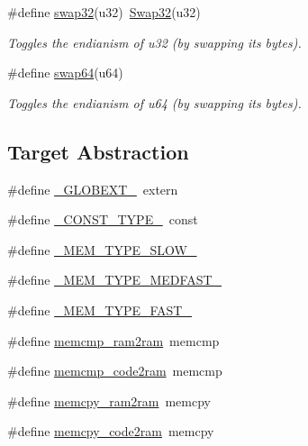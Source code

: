 \begin{DoxyCompactItemize}
\#define \mbox{\hyperlink{group__group__sam0__utils_ga46025d8a12ccc9f4268c84e56c457416}{swap32}}(u32)~\mbox{\hyperlink{group__group__sam0__utils_ga5e9bc2e3b3e43eadc3210b02cab6ac64}{Swap32}}(u32)
\begin{DoxyCompactList}\small\item\em Toggles the endianism of {\itshape u32} (by swapping its bytes). \end{DoxyCompactList}\item 
\#define \mbox{\hyperlink{group__group__sam0__utils_ga78484801bd5bea7d382b34a4ed1f345d}{swap64}}(u64)
\begin{DoxyCompactList}\small\item\em Toggles the endianism of {\itshape u64} (by swapping its bytes). \end{DoxyCompactList}\end{DoxyCompactItemize}
\subsection*{Target Abstraction}
\begin{DoxyCompactItemize}
\item 
\#define \mbox{\hyperlink{group__group__sam0__utils_gad4d03be3b8f3d15ed804170a1311ec98}{\+\_\+\+G\+L\+O\+B\+E\+X\+T\+\_\+}}~extern
\item 
\#define \mbox{\hyperlink{group__group__sam0__utils_ga8e0d79d43ad9295d5193ca29f109a762}{\+\_\+\+C\+O\+N\+S\+T\+\_\+\+T\+Y\+P\+E\+\_\+}}~const
\item 
\#define \mbox{\hyperlink{group__group__sam0__utils_ga35d552e8456cfb2b810baa0a9212c98e}{\+\_\+\+M\+E\+M\+\_\+\+T\+Y\+P\+E\+\_\+\+S\+L\+O\+W\+\_\+}}
\item 
\#define \mbox{\hyperlink{group__group__sam0__utils_gadcd997c76f95854090b17513c4ef3891}{\+\_\+\+M\+E\+M\+\_\+\+T\+Y\+P\+E\+\_\+\+M\+E\+D\+F\+A\+S\+T\+\_\+}}
\item 
\#define \mbox{\hyperlink{group__group__sam0__utils_gabf669e579471cadcf68d9ffc440e68b1}{\+\_\+\+M\+E\+M\+\_\+\+T\+Y\+P\+E\+\_\+\+F\+A\+S\+T\+\_\+}}
\item 
\#define \mbox{\hyperlink{group__group__sam0__utils_ga27819e952caa0a535a5901d2857834b7}{memcmp\+\_\+ram2ram}}~memcmp
\item 
\#define \mbox{\hyperlink{group__group__sam0__utils_gab914bad47205a9b7afb9ac53ec71cb55}{memcmp\+\_\+code2ram}}~memcmp
\item 
\#define \mbox{\hyperlink{group__group__sam0__utils_ga9a4ff08e7c4cf79135a3bcbab68472b7}{memcpy\+\_\+ram2ram}}~memcpy
\item 
\#define \mbox{\hyperlink{group__group__sam0__utils_ga55724cc8f7d42eba122dac5bffa00024}{memcpy\+\_\+code2ram}}~memcpy
\end{DoxyCompactItemize}


